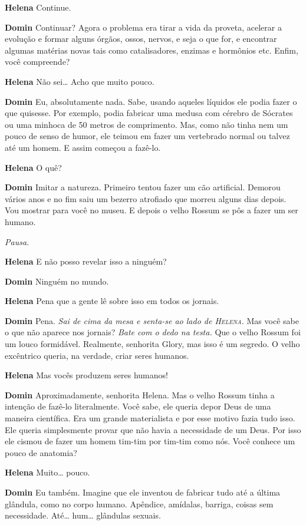 \textbf{Helena} Continue.

\textbf{Domin} Continuar? Agora o problema era tirar a vida da proveta, acelerar a
evolução e formar alguns órgãos, ossos, nervos, e seja o que for, e encontrar
algumas matérias novas tais como catalisadores, enzimas e hormônios etc.
Enfim, você compreende?

\textbf{Helena} Não sei\ldots{} Acho que muito pouco.

\textbf{Domin} Eu, absolutamente nada. Sabe, usando aqueles líquidos ele podia fazer o
que quisesse. Por exemplo, podia fabricar uma medusa com cérebro de Sócrates ou
uma minhoca de 50 metros de comprimento. Mas, como não tinha nem um pouco de
senso de humor, ele teimou em fazer um vertebrado normal ou talvez até um homem.
E assim começou a fazê-lo.

\textbf{Helena} O quê?

\textbf{Domin} Imitar a natureza. Primeiro tentou fazer um cão artificial. Demorou
vários anos e no fim saiu um bezerro atrofiado que morreu alguns dias
depois. Vou mostrar para você no museu. E depois o velho Rossum se pôs a fazer
um ser humano.

\emph{Pausa.}

\textbf{Helena} E não posso revelar isso a ninguém?

\textbf{Domin} Ninguém no mundo.

\textbf{Helena} Pena que a gente lê sobre isso em todos os jornais.

\textbf{Domin} Pena. \emph{Sai de cima da mesa e senta-se ao lado de \textsc{Helena}.} Mas você
sabe o que não aparece nos jornais? \emph{Bate com o dedo na testa.} Que o
velho Rossum foi um louco formidável. Realmente, senhorita Glory, mas isso é um
segredo. O velho excêntrico queria, na verdade, criar seres humanos.

\textbf{Helena} Mas vocês produzem seres humanos!

\textbf{Domin} Aproximadamente, senhorita Helena. Mas o velho Rossum tinha a intenção de
fazê-lo literalmente. Você sabe, ele queria depor Deus de uma maneira
científica. Era um grande materialista e por esse motivo fazia tudo isso. Ele 
queria simplesmente provar que não havia a necessidade de um Deus. Por
isso ele cismou de fazer um homem tim-tim por tim-tim como nós. Você conhece um
pouco de anatomia?

\textbf{Helena} Muito\ldots{} pouco.

\textbf{Domin} Eu também. Imagine que ele inventou de fabricar tudo até a última glândula,
como no corpo humano. Apêndice, amídalas, barriga, coisas sem necessidade.
Até\ldots{} hum\ldots{} glândulas sexuais.

